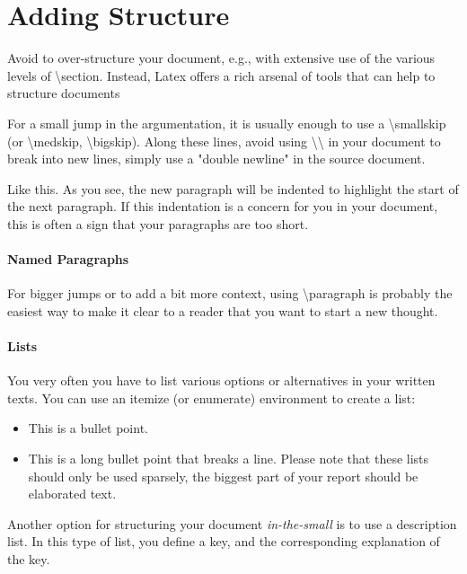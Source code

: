 \section{Adding Structure}

Avoid to over-structure your document, e.g., with extensive use of the various levels of \textbackslash{}section.
Instead, Latex offers a rich arsenal of tools that can help to structure documents

\smallskip
For a small jump in the argumentation, it is usually enough to use a \textbackslash{}smallskip (or \textbackslash{}medskip, \textbackslash{}bigskip).
Along these lines, avoid using \textbackslash{}\textbackslash{} in your document to break into new lines, simply use a "double newline" in the source document.

Like this. As you see, the new paragraph will be indented to highlight the start of the next paragraph.
If this indentation is a concern for you in your document, this is often a sign that your paragraphs are too short.



\paragraph{Named Paragraphs}
For bigger jumps or to add a bit more context, using \textbackslash{}paragraph is probably the easiest way to make it clear to a reader that you want to start a new thought.


\paragraph{Lists}

You very often you have to list various options or alternatives in your written texts.
You can use an itemize (or enumerate) environment to create a list:

\begin{itemize} %
\item This is a bullet point.
\item This is a long bullet point that breaks a line. Please note that these lists should only be used sparsely, the biggest part of your report should be elaborated text.
\end{itemize} %

Another option for structuring your document \emph{in-the-small} is to use a description list.
In this type of list, you define a key, and the corresponding explanation of the key.

